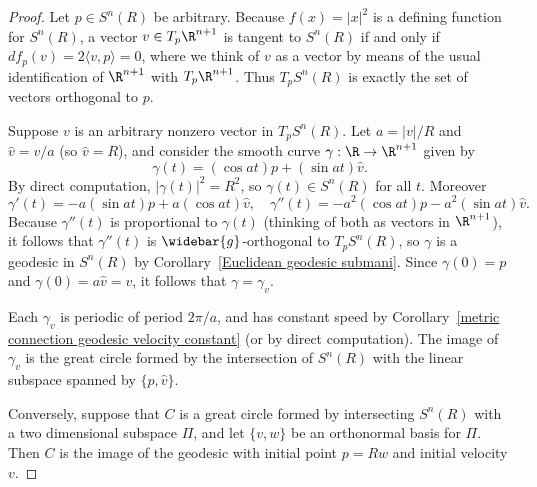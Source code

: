 \begin{proof}
Let $p\in S^n(R)$ be arbitrary. Because $f(x)=|x|^2$ is a defining function for $S^n(R)$, a vector $v\in T_p\R^{n+1}$ is tangent to $S^n(R)$ if and only if $df_p(v)=2\langle v,p\rangle=0$, 
where we think of $v$ as a vector by means of the usual identification of $\R^{n+1}$ with $T_p\R^{n+1}$. Thus $T_pS^n(R)$ is exactly the set of vectors orthogonal to $p$.\par
Suppose $v$ is an arbitrary nonzero vector in $T_pS^n(R)$. Let $a=|v|/R$ and $\hat{v}=v/a$ (so $\hat{v}=R$), and consider the smooth curve 
$\gamma:\R\to\R^{n+1}$ given by
\[\gamma(t)=(\cos at)p+(\sin at)\hat{v}.\]
By direct computation, $|\gamma(t)|^2=R^2$, so $\gamma(t)\in S^n(R)$ for all $t$. Moreover
\[\gamma'(t)=-a(\sin at)p+a(\cos at)\hat{v},\quad \gamma''(t)=-a^2(\cos at)p-a^2(\sin at)\hat{v}.\]
Because $\gamma''(t)$ is proportional to $\gamma(t)$ (thinking of both as vectors in $\R^{n+1}$), it follows that $\gamma''(t)$ is $\widebar{g}$-orthogonal to $T_pS^n(R)$, 
so $\gamma$ is a geodesic in $S^n(R)$ by Corollary~\ref{Euclidean geodesic submani}. Since $\gamma(0)=p$ and $\gamma(0)=a\hat{v}=v$, it follows that 
$\gamma=\gamma_v$.\par
Each $\gamma_v$ is periodic of period $2\pi/a$, and has constant speed by Corollary~\ref{metric connection geodesic velocity constant} (or by direct computation). The 
image of $\gamma_v$ is the great circle formed by the intersection of $S^n(R)$ with the linear subspace spanned by $\{p,\hat{v}\}$.\par
Conversely, suppose that $C$ is a great circle formed by intersecting $S^n(R)$ with a two dimensional subspace $\Pi$, and let $\{v,w\}$ be an orthonormal basis for $\Pi$. 
Then $C$ is the image of the geodesic with initial point $p=Rw$ and initial velocity $v$.
\end{proof}
